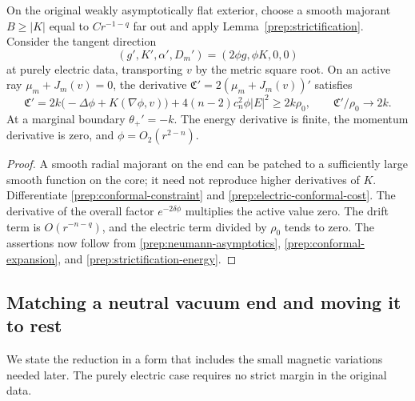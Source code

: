 \begin{corollary}
\label{prep:strict-direction}
On the original weakly asymptotically flat exterior, choose a smooth
majorant $B\geq|K|$ equal to $Cr^{-1-q}$ far out and apply
Lemma~\ref{prep:strictification}.  Consider the tangent direction
\[
 (g',K',\alpha',D_m')=(2\phi g,\phi K,0,0)
\]
at purely electric data, transporting $v$ by the metric square root.
On an active ray $\mu_m+J_m(v)=0$, the derivative
$\mathfrak C'=2(\mu_m+J_m(v))'$ satisfies
\begin{equation}
 \label{prep:strict-ray-derivative}
 \mathfrak C'
 =2k\bigl(-\Delta\phi+K(\nabla\phi,v)\bigr)
       +4(n-2)c_n^2\phi|E|^2
 \geq2k\rho_0,
 \qquad \mathfrak C'/\rho_0\longrightarrow2k.
\end{equation}
At a marginal boundary $\theta_+'=-k$.  The energy derivative is finite,
the momentum derivative is zero, and $\phi=O_2(r^{2-n})$.
\end{corollary}

\begin{proof}
A smooth radial majorant on the end can be patched to a sufficiently
large smooth function on the core; it need not reproduce higher
derivatives of $K$.  Differentiate
\eqref{prep:conformal-constraint} and
\eqref{prep:electric-conformal-cost}.  The derivative of the overall
factor $e^{-2\delta\phi}$ multiplies the active value zero.  The drift
term is $O(r^{-n-q})$, and the electric term divided by $\rho_0$ tends
to zero.  The assertions now follow from
\eqref{prep:neumann-asymptotics},
\eqref{prep:conformal-expansion}, and
\eqref{prep:strictification-energy}.
\end{proof}

\subsection{Matching a neutral vacuum end and moving it to rest}

We state the reduction in a form that includes the small magnetic
variations needed later.  The purely electric case requires no strict
margin in the original data.


